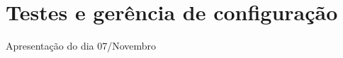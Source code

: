 \chapter{Testes e gerência de configuração}
\label{cap:testeconfiguracao}

Apresentação do dia 07/Novembro